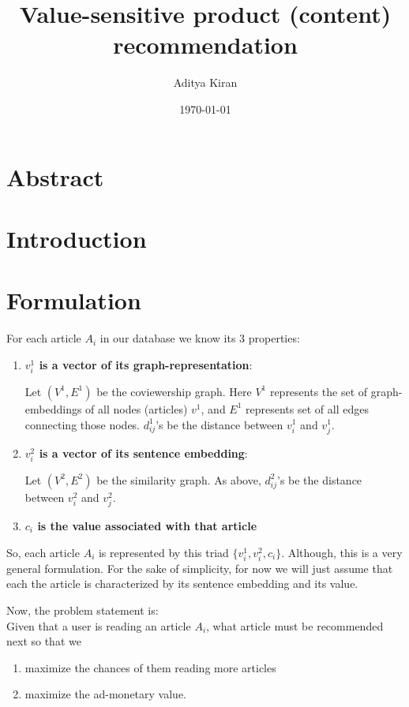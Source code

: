\documentclass[11]{article}
\title{Value-sensitive product (content) recommendation}
\author{Aditya Kiran }
\date{\today}
\begin{document}
\maketitle
\section{Abstract}


\section{Introduction}

\section{Formulation}
For each article $A_i$ in our database we know its 3 properties:
\begin{enumerate}

\item \textbf{$v^1_i$ is a vector of its graph-representation}:

Let $(V^1, E^1)$ be the coviewership graph. Here $V^1$ represents the set of graph-embeddings of all nodes (articles) $v^1$, and $E^1$ represents set of all edges connecting those nodes.  $d^1_{ij}$'s be the distance between $v^1_i$ and $v^1_j$. 
 
\item \textbf{$v^2_i$ is a vector of its sentence embedding}:

Let $(V^2, E^2)$ be the similarity graph. As above, $d^2_{ij}$'s be the distance between $v^2_i$ and $v^2_j$.

\item \textbf{$c_i$ is the value associated with that article}
\end{enumerate}
So, each article $A_i$ is represented by this triad $\{ v^1_i, v^2_i, c_i \}$. Although, this is a very general formulation. For the sake of simplicity, for now we will just assume that each the article is characterized by its sentence embedding and its value.


Now, the problem statement is: \\
Given that a user is reading an article $A_i$, what article must be recommended next so that we
\begin{enumerate}
\item maximize the chances of them reading more articles 
\item maximize the ad-monetary value.
\end{enumerate} 
\end{document}
